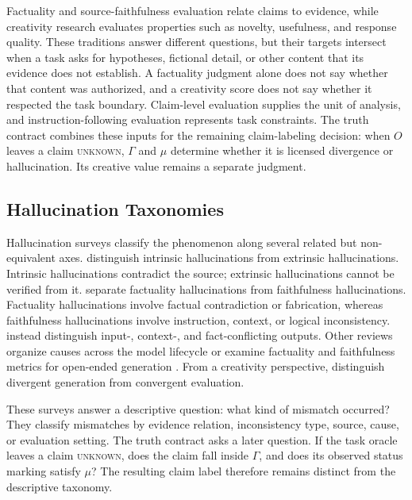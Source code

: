 \documentclass{clv2025}
\begin{document}
Factuality and source-faithfulness evaluation relate claims to evidence, while
creativity research evaluates properties such as novelty, usefulness, and
response quality. These traditions answer different questions, but their
targets intersect when a task asks for hypotheses, fictional detail, or other
content that its evidence does not establish. A factuality judgment alone does
not say whether that content was authorized, and a creativity score does not
say whether it respected the task boundary. Claim-level evaluation supplies the
unit of analysis, and instruction-following evaluation represents task
constraints. The truth contract combines these inputs for the remaining
claim-labeling decision: when $O$ leaves a claim \textsc{unknown}, $\Gamma$ and
$\mu$ determine whether it is licensed divergence or hallucination. Its
creative value remains a separate judgment.

\subsection{Hallucination Taxonomies}

Hallucination surveys classify the phenomenon along several related but
non-equivalent axes.
\citet{ji_survey_2023} distinguish intrinsic hallucinations from extrinsic
hallucinations. Intrinsic hallucinations contradict the source; extrinsic
hallucinations cannot be verified from it.
\citet{huang_survey_2025} separate factuality hallucinations from faithfulness
hallucinations. Factuality hallucinations involve factual contradiction or
fabrication, whereas faithfulness hallucinations involve instruction, context,
or logical inconsistency.
\citet{zhang_sirens_2025} instead distinguish input-, context-, and fact-conflicting outputs.
Other reviews organize causes across the model lifecycle or examine factuality and faithfulness metrics for open-ended generation \citep{wang_factuality_survey_2024,malin_faithfulness_review_2025,lamba_lifecycle_2026}.
From a creativity perspective, \citet{jiang_survey_2024} distinguish divergent generation from convergent evaluation.

These surveys answer a descriptive question: what kind of mismatch occurred?
They classify mismatches by evidence relation, inconsistency type, source,
cause, or evaluation setting.
The truth contract asks a later question.
If the task oracle leaves a claim \textsc{unknown}, does the claim fall inside
$\Gamma$, and does its observed status marking satisfy $\mu$?
The resulting claim label therefore remains distinct from the descriptive
taxonomy.
\end{document}
